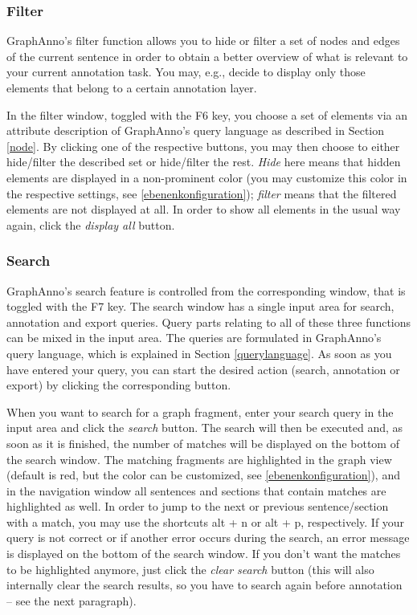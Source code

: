 \documentclass[12pt]{scrartcl}
\begin{document}
\subsubsection{Filter}

GraphAnno’s filter function allows you to hide or filter a set of nodes and edges of the current sentence in order to obtain a better overview of what is relevant to your current annotation task.
You may, e.g., decide to display only those elements that belong to a certain annotation layer.

In the filter window, toggled with the F6 key, you choose a set of elements via an attribute description of GraphAnno’s query language as described in Section \ref{node}.
By clicking one of the respective buttons, you may then choose to either hide/filter the described set or hide/filter the rest.
\textit{Hide} here means that hidden elements are displayed in a non-prominent color (you may customize this color in the respective settings, see \ref{ebenenkonfiguration}); \textit{filter} means that the filtered elements are not displayed at all.
In order to show all elements in the usual way again, click the \textit{display all} button.

\subsubsection{Search}\label{window-search}

GraphAnno’s search feature is controlled from the corresponding window, that is toggled with the F7 key.
The search window has a single input area for search, annotation and export queries.
Query parts relating to all of these three functions can be mixed in the input area.
The queries are formulated in GraphAnno’s query language, which is explained in Section \ref{querylanguage}.
As soon as you have entered your query, you can start the desired action (search, annotation or export) by clicking the corresponding button.

When you want to search for a graph fragment, enter your search query in the input area and click the \textit{search} button.
The search will then be executed and, as soon as it is finished, the number of matches will be displayed on the bottom of the search window.
The matching fragments are highlighted in the graph view (default is red, but the color can be customized, see \ref{ebenenkonfiguration}), and in the navigation window all sentences and sections that contain matches are highlighted as well.
In order to jump to the next or previous sentence/section with a match, you may use the shortcuts alt + n or alt + p, respectively. 
If your query is not correct or if another error occurs during the search, an error message is displayed on the bottom of the search window.
If you don’t want the matches to be highlighted anymore, just click the \textit{clear search} button (this will also internally clear the search results, so you have to search again before annotation – see the next paragraph).
\end{document}
